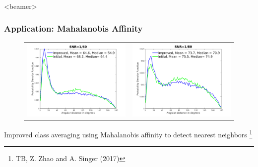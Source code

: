 \documentclass{beamer}
\newcommand\blfootnote[1]{%
  \begingroup
  \renewcommand\thefootnote{}\footnote{#1}%
  \addtocounter{footnote}{-1}%
  \endgroup
}
\begin{document}

\begin{frame}<beamer>
\frametitle{Application: Mahalanobis Affinity}
\begin{figure}
\begin{center}
\begin{tabular}{cc}
\includegraphics[width=.49\columnwidth]{figures/fighist_snr1by60.png} & \includegraphics[width=.49\columnwidth]{figures/fighist_snr1by80.png}
\end{tabular}
\end{center}
\end{figure}
Improved class averaging using Mahalanobis affinity to detect nearest neighbors \blfootnote{TB, Z. Zhao and A. Singer (2017)}
\end{frame}
\end{document}
